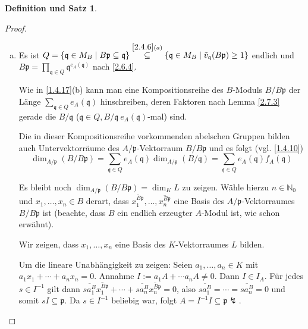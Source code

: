 \documentclass[
twoside=semi,
fontsize=12,
DIV=12, 
cleardoublepage=current,
leqno,
headings=optiontoheadandtoc, 
toc=idx
]{scrbook}
\newcommand{\N}{\mathbb{N}}
\newcommand{\set}[1]{\left\{ #1 \right\}}
\theoremstyle{definition}
\newtheorem{def-satz}[definition]{Definition und Satz}
\begin{document}
\begin{def-satz}
\begin{proof}
\begin{enumerate}[(a)]
 				Nach Satz \ref{2.5.2} (und \ref{2.2.12}) ist $B$ als $A$-Modul endlich erzeugt und daher $B/\mathfrak{q}$ ein endlich erzeugter  $A/\mathfrak{p}$ Vektorraum, also $f_A(\mathfrak{q}) = [(B/\mathfrak{q}):(A/\mathfrak{p})] = \dim_{A/\mathfrak{p}}(B/\mathfrak{q} )~\in~\N$.
 				
 				
 				\item 
 				Es ist $Q = \set{\mathfrak{q} \in M_B \mid B\mathfrak{p} \subseteq \mathfrak{q}} \overset{\ref{2.4.6}(a)}{\subseteq} \set{\mathfrak{q} \in M_B \mid \tilde{v}_\mathfrak{q}(B\mathfrak{p}) \geq 1} $ endlich und \linebreak $B\mathfrak{p} = \prod_{\mathfrak{q} \in Q} \mathfrak{q}^{e_A(\mathfrak{q})}$ nach \ref{2.6.4}.
 				
 				Wie in \ref{1.4.17}(b) kann man eine Kompositionsreihe des $B$-Moduls $B/B\mathfrak{p}$ der L\"ange $\sum_{\mathfrak{q} \in Q} e_A(\mathfrak{q})$ hinschreiben, deren Faktoren nach Lemma \ref{2.7.3} gerade die $B/\mathfrak{q}$ \linebreak ($\mathfrak{q} \in Q, B/\mathfrak{q} \ e_A(\mathfrak{q})$-mal) sind.
 				
 				Die in dieser Kompositionsreihe vorkommenden abelschen Gruppen bilden auch Untervektorr\"aume des $A/\mathfrak{p}$-Vektorraum $B/B\mathfrak{p}$ und es folgt (vgl. \ref{1.4.10}) \[\dim_{A/\mathfrak{p}} (B/B\mathfrak{p}) = \sum_{\mathfrak{q} \in Q} e_A(\mathfrak{q})\dim_{A/\mathfrak{p}} (B/\mathfrak{q}) = \sum_{\mathfrak{q} \in Q} e_A(\mathfrak{q})f_A(\mathfrak{q})\]
 				
 				Es bleibt noch $\dim_{A/\mathfrak{p}}(B/B\mathfrak{p}) = \dim_K L$ zu zeigen. W\"ahle hierzu $n \in \N_0$ und $x_1, \dots, x_n \in B$ derart, dass $\overline{x_1^{B\mathfrak{p}}}, \dots, \overline{x_n^{B\mathfrak{p}}}$ eine Basis des $A/\mathfrak{p}$-Vektorraumes $B/B\mathfrak{p}$ ist (beachte, dass $B$ ein endlich erzeugter $A$-Modul ist, wie schon erw\"ahnt).
 				
 				Wir zeigen, dass $x_1, \dots, x_n$ eine Basis des $K$-Vektorraumes $L$ bilden.
 				
 				Um die lineare Unabh\"angigkeit zu zeigen: Seien $a_1, \dots, a_n \in K$ mit \linebreak $a_1x_1 + \cdots + a_nx_n = 0$. Annahme $I:= a_1A + \cdots a_nA \neq 0$. Dann $I \in I_A$. F\"ur jedes $s \in I^{-1}$ gilt dann $\overline{sa_1^{B}}\overline{x_1^{B\mathfrak{p}}} + \cdots + \overline{sa_n^{B}}\overline{x_n^{B\mathfrak{p}}} = 0$, also $\overline{sa_1^{B}} = \cdots = \overline{sa_n^{B}}  = 0$ und somit $sI \subseteq \mathfrak{p}$. Da $s\in I^{-1}$ beliebig war, folgt $A = I^{-1}I \subseteq \mathfrak{p}\lightning$.
 				

\end{enumerate}
\end{proof}
\end{def-satz}
\end{document}
